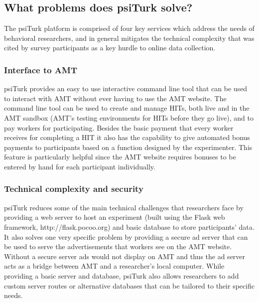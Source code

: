 \documentclass[twocolumn]{svjour3}          %
\begin{document}
\subsection{What problems does psiTurk solve?}

The psiTurk platform is comprised of four key services which address the needs of behavioral researchers, and in general mitigates the technical complexity that was cited by survey participants as a key hurdle to online data collection.

\subsubsection{Interface to AMT}
psiTurk provides an easy to use interactive command line tool that can be used to 
interact with AMT without ever having to use the AMT website.  
The command line tool can be used to create and manage HITs, both live and in the AMT sandbox 
(AMT's testing environments for HITs before they go live), and to pay workers for
participating. Besides the basic payment that every worker receives for completing a HIT
it also has the capability to give automated bonus payments to participants based on a function
designed by the experimenter. This feature is particularly helpful since the AMT website
requires bonuses to be entered by hand for each participant individually.


\subsubsection{Technical complexity and security}
psiTurk reduces some of the main technical challenges that researchers face by providing a 
web server to host an experiment (built using the Flask web framework, http://flask.pocoo.org) and basic database to store participants' data.
It also solves one very specific problem by providing a secure ad server that can
be used to serve the advertisements that workers see on the AMT website. Without a secure server
 ads would not display on AMT and thus the ad server acts as a bridge between AMT and 
 a researcher's local computer. 
While providing a basic server and database, psiTurk also allows researchers to add custom
server routes or alternative databases that can be tailored to their specific needs.
\end{document}

